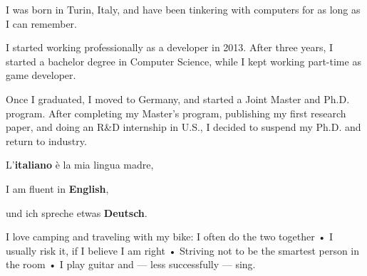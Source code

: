 


I was born in Turin, Italy, and have been tinkering with computers for as long as
I can remember. 

I started working professionally as a developer in 2013. After three years, I started a bachelor degree in Computer Science, while I kept working part-time as game developer.

Once I graduated, I moved to Germany, and started a Joint Master and Ph.D. program. 
After completing my Master’s program, publishing my first research paper, and doing an R\&D internship in U.S., I decided to suspend my Ph.D. and return to industry.


L'\textbf{italiano} è la mia lingua madre,

I am fluent in \textbf{English},

und ich spreche etwas \textbf{Deutsch}.


I love camping and traveling with my bike: I often do the two together • I usually risk it, if I believe I am right • Striving not to be the smartest person in the room • I play guitar and --- less successfully --- sing.